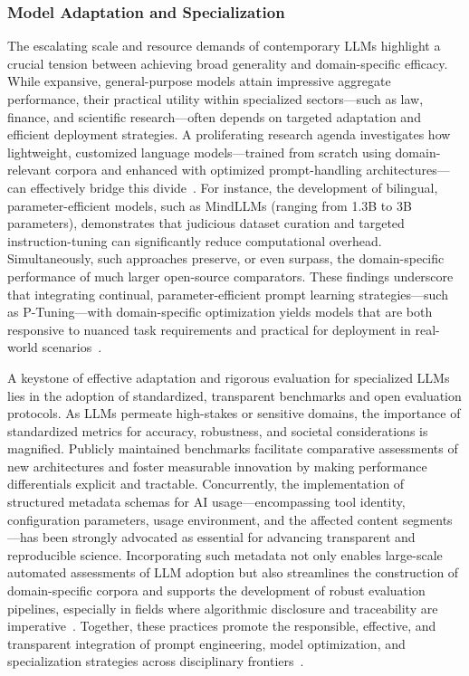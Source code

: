 \documentclass[sigconf]{acmart}
\begin{document}
\subsubsection{Model Adaptation and Specialization}

The escalating scale and resource demands of contemporary LLMs highlight a crucial tension between achieving broad generality and domain-specific efficacy. While expansive, general-purpose models attain impressive aggregate performance, their practical utility within specialized sectors---such as law, finance, and scientific research---often depends on targeted adaptation and efficient deployment strategies. A proliferating research agenda investigates how lightweight, customized language models---trained from scratch using domain-relevant corpora and enhanced with optimized prompt-handling architectures---can effectively bridge this divide~\cite{ref104}. For instance, the development of bilingual, parameter-efficient models, such as MindLLMs (ranging from 1.3B to 3B parameters), demonstrates that judicious dataset curation and targeted instruction-tuning can significantly reduce computational overhead. Simultaneously, such approaches preserve, or even surpass, the domain-specific performance of much larger open-source comparators. These findings underscore that integrating continual, parameter-efficient prompt learning strategies---such as P-Tuning---with domain-specific optimization yields models that are both responsive to nuanced task requirements and practical for deployment in real-world scenarios~\cite{ref103}\cite{ref104}.

A keystone of effective adaptation and rigorous evaluation for specialized LLMs lies in the adoption of standardized, transparent benchmarks and open evaluation protocols. As LLMs permeate high-stakes or sensitive domains, the importance of standardized metrics for accuracy, robustness, and societal considerations is magnified. Publicly maintained benchmarks facilitate comparative assessments of new architectures and foster measurable innovation by making performance differentials explicit and tractable. Concurrently, the implementation of structured metadata schemas for AI usage---encompassing tool identity, configuration parameters, usage environment, and the affected content segments---has been strongly advocated as essential for advancing transparent and reproducible science. Incorporating such metadata not only enables large-scale automated assessments of LLM adoption but also streamlines the construction of domain-specific corpora and supports the development of robust evaluation pipelines, especially in fields where algorithmic disclosure and traceability are imperative~\cite{ref106}. Together, these practices promote the responsible, effective, and transparent integration of prompt engineering, model optimization, and specialization strategies across disciplinary frontiers~\cite{ref104}\cite{ref106}.
\end{document}
